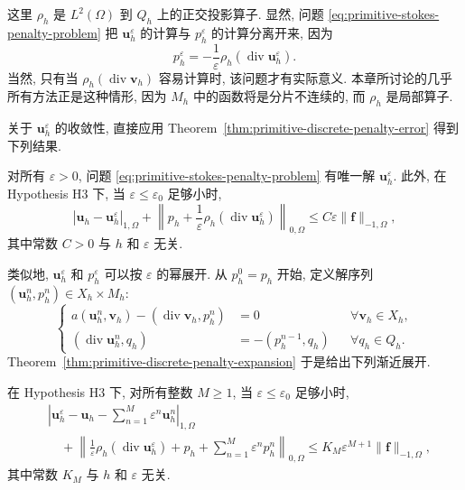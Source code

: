 这里 $\rho_h$ 是 $L^2(\Omega)$ 到 $Q_h$ 上的正交投影算子.
显然, 问题 \eqref{eq:primitive-stokes-penalty-problem} 把
$\mathbf u_h^\varepsilon$ 的计算与 $p_h^\varepsilon$ 的计算分离开来, 因为
\[
p_h^\varepsilon
=-\frac{1}{\varepsilon}\rho_h(\operatorname{div}\mathbf u_h^\varepsilon).
\]
当然, 只有当 $\rho_h(\operatorname{div}\mathbf v_h)$ 容易计算时,
该问题才有实际意义. 本章所讨论的几乎所有方法正是这种情形,
因为 $M_h$ 中的函数将是分片不连续的, 而 $\rho_h$ 是局部算子.

关于 $\mathbf u_h^\varepsilon$ 的收敛性, 直接应用
Theorem~\ref{thm:primitive-discrete-penalty-error} 得到下列结果.

\setcounter{statement}{9}
\begin{Theorem}\label{thm:primitive-stokes-penalty-error}
对所有 $\varepsilon>0$, 问题
\eqref{eq:primitive-stokes-penalty-problem} 有唯一解 $\mathbf u_h^\varepsilon$.
此外, 在 Hypothesis H3 下, 当 $\varepsilon\leq\varepsilon_0$ 足够小时,
\[
|\mathbf u_h-\mathbf u_h^\varepsilon|_{1,\Omega}
+\left\|p_h+\frac{1}{\varepsilon}
\rho_h(\operatorname{div}\mathbf u_h^\varepsilon)\right\|_{0,\Omega}
\leq C\varepsilon\|\mathbf f\|_{-1,\Omega},
\]
其中常数 $C>0$ 与 $h$ 和 $\varepsilon$ 无关.
\end{Theorem}

类似地, $\mathbf u_h^\varepsilon$ 和 $p_h^\varepsilon$ 可以按
$\varepsilon$ 的幂展开. 从 $p_h^0=p_h$ 开始, 定义解序列
$(\mathbf u_h^n,p_h^n)\in X_h\times M_h$:
\begin{equation}\label{eq:primitive-stokes-penalty-corrections}
\left\{
\begin{aligned}
a(\mathbf u_h^n,\mathbf v_h)
-(\operatorname{div}\mathbf v_h,p_h^n)&=0
&&\forall\mathbf v_h\in X_h,\\
(\operatorname{div}\mathbf u_h^n,q_h)
&=-(p_h^{n-1},q_h)
&&\forall q_h\in Q_h.
\end{aligned}
\right.
\end{equation}
Theorem~\ref{thm:primitive-discrete-penalty-expansion} 于是给出下列渐近展开.

\setcounter{statement}{10}
\begin{Theorem}\label{thm:primitive-stokes-penalty-expansion}
在 Hypothesis H3 下, 对所有整数 $M\geq1$, 当
$\varepsilon\leq\varepsilon_0$ 足够小时,
\[
\begin{split}
&\left|\mathbf u_h^\varepsilon-\mathbf u_h-
\sum_{n=1}^M\varepsilon^n\mathbf u_h^n\right|_{1,\Omega}\\
&\quad+\left\|\frac{1}{\varepsilon}
\rho_h(\operatorname{div}\mathbf u_h^\varepsilon)+p_h+
\sum_{n=1}^M\varepsilon^np_h^n\right\|_{0,\Omega}
\leq K_M\varepsilon^{M+1}\|\mathbf f\|_{-1,\Omega},
\end{split}
\]
其中常数 $K_M$ 与 $h$ 和 $\varepsilon$ 无关.
\end{Theorem}

